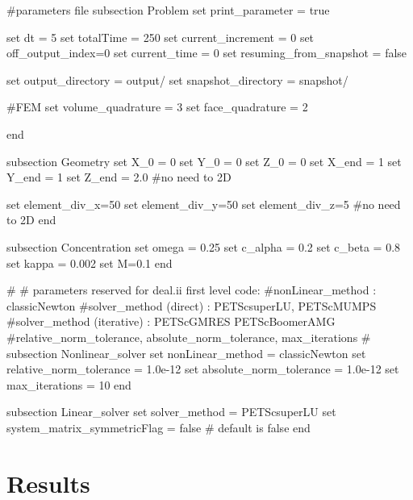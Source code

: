 \begin{DoxyCode}
\textcolor{preprocessor}{#parameters file}
\textcolor{preprocessor}{}
subsection Problem
set print\_parameter = \textcolor{keyword}{true}

set dt = 5
set totalTime = 250
set current\_increment = 0
set off\_output\_index=0
set current\_time = 0
set resuming\_from\_snapshot = \textcolor{keyword}{false}

set output\_directory = output/
set snapshot\_directory = snapshot/

\textcolor{preprocessor}{#FEM}
\textcolor{preprocessor}{}set volume\_quadrature = 3 
set face\_quadrature = 2 

end

subsection Geometry
set X\_0 = 0
set Y\_0 = 0
set Z\_0 = 0
set X\_end = 1 
set Y\_end = 1
set Z\_end = 2.0 #no need to 2D

set element\_div\_x=50
set element\_div\_y=50
set element\_div\_z=5 #no need to 2D
end

subsection Concentration
set omega = 0.25
set c\_alpha = 0.2
set c\_beta = 0.8
set kappa = 0.002
set M=0.1
end
                        
\textcolor{preprocessor}{#}
\textcolor{preprocessor}{}\textcolor{preprocessor}{# parameters reserved for deal.ii first level code:}
\textcolor{preprocessor}{}\textcolor{preprocessor}{#nonLinear\_method : classicNewton}
\textcolor{preprocessor}{}\textcolor{preprocessor}{#solver\_method (direct) : PETScsuperLU, PETScMUMPS}
\textcolor{preprocessor}{}\textcolor{preprocessor}{#solver\_method (iterative) : PETScGMRES PETScBoomerAMG}
\textcolor{preprocessor}{}\textcolor{preprocessor}{#relative\_norm\_tolerance, absolute\_norm\_tolerance, max\_iterations}
\textcolor{preprocessor}{}\textcolor{preprocessor}{#}
\textcolor{preprocessor}{}subsection Nonlinear\_solver
        set nonLinear\_method = classicNewton
        set relative\_norm\_tolerance = 1.0e-12
        set absolute\_norm\_tolerance = 1.0e-12
        set max\_iterations = 10
end
                        
subsection Linear\_solver
        set solver\_method = PETScsuperLU
        set system\_matrix\_symmetricFlag = \textcolor{keyword}{false} # \textcolor{keywordflow}{default} is \textcolor{keyword}{false}
end
\end{DoxyCode}
\hypertarget{growth_results}{}\section{Results}\label{growth_results}
  